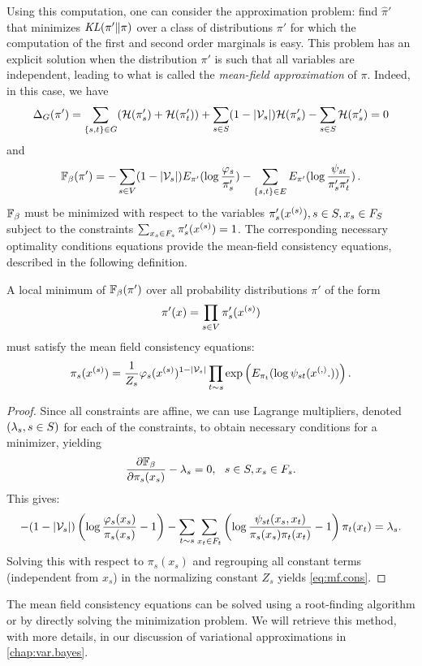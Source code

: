 Using this computation, one can consider the approximation problem:
find $\hat \pi'$ that minimizes $\mathit{KL}(\pi'\|\pi)$ over a class of
distributions $\pi'$ for which the computation of the first and second
order marginals is easy. This problem has an explicit solution when
the distribution $\pi'$ is such that all variables are
independent, leading to what is called the {\em mean-field
  approximation} of $\pi$. Indeed, in this case, we have
$$
\Delta_G(\pi') =  \sum_{\left\{ s, t \right\} \in G} ({\mathcal H}(\pi'_{s}) + {\mathcal H}(\pi'_t))
+ \sum_{s\in S} (1-|{\mathcal V}_s|) {\mathcal H}(\pi'_s) -  \sum_{s\in S} {\mathcal H}(\pi'_s) = 0
$$
and
$$
\mathbb F_\beta(\pi') = -  \sum_{s\in V} (1-|{\mathcal V}_s|)E_{\pi'} (\log \frac{\varphi_s}{\pi'_s}) -
\sum_{\left\{ s,t \right\}\in E} E_{\pi'} ( \log
\frac{\psi_{st}}{\pi'_{s}\pi'_t})\, .
$$
$\mathbb F_\beta$ must be minimized with respect to the variables $\pi'_s(x^{(s)}), s\in S,
x_s\in F_S$ subject to the constraints $\sum_{x_s\in F_s} \pi'_s(x^{(s)}) =
1$. The corresponding necessary optimality conditions  equations provide the mean-field
consistency equations, described in the following definition.
\begin{proposition}
\label{prop:mean.f}
A local minimum of $\mathbb F_\beta(\pi')$ over all probability distributions
$\pi'$ of the form
$$
\pi'(x) = \prod_{s\in V}\pi'_s(x^{(s)})
$$
must satisfy the mean field consistency equations:
\begin{equation}
\label{eq:mf.cons}
\pi_s(x^{(s)}) = \frac{1}{Z_s}\varphi_s(x^{(s)})^{1-|\mathcal V_s|}\prod_{t\sim s} \exp\left(E_{\pi_t} (\log\psi_{st}(x^{(,)} .))\right).
\end{equation}
\end{proposition}
\begin{proof}
Since all constraints are affine, we can use Lagrange multipliers, denoted $(\lambda_s, s\in S)$ for each of the
constraints, to obtain necessary conditions for a minimizer, yielding
$$
\frac{\partial {\mathbb F_\beta}}{\partial{\pi_s(x_s)}} -\lambda_s = 0, \ \ s\in S, x_s\in F_s.
$$
This gives:
\[
-(1-|{\mathcal V}_s|)\left(\log \frac{\varphi_s(x_s)}{\pi_s(x_s)} -1\right) 
-\sum_{t\sim s} \sum_{x_t\in F_t}\left(\log\frac{\psi_{st}(x_s,
x_t)}{\pi_s(x_s)\pi_t(x_t)}-1\right)\pi_t(x_t) = \lambda_s.
\]
Solving this with respect to $\pi_s(x_s)$ and regrouping all constant
terms (independent from $x_s$) in the normalizing constant $Z_s$ yields
\cref{eq:mf.cons}.
\end{proof}

The mean field consistency equations can be solved using a
root-finding algorithm or by directly solving the minimization
problem. We will retrieve this method, with more details, in our discussion of variational approximations in \cref{chap:var.bayes}.

